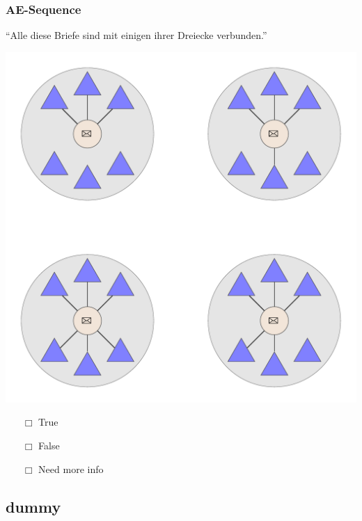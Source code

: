 \documentclass[fleqn,10pt,xcolor=dvipsnames]{beamer}
\renewcommand{\AE}{AE\xspace}
\newcommand{\mymark}[1]{{\color{mycol}{#1}}}
\begin{document}
\begin{frame}
  \frametitle{\AE-Sequence}
  \begin{center}
    ``Alle diese Briefe sind mit einigen ihrer Dreiecke verbunden.''

    \vspace{0.1cm}

    \includegraphics[width=0.5 \textwidth]{../../pictures/ae_01_7.pdf}

    \vspace{0.1cm}

    \begin{multicols}{3}
      \begin{itemize} 
      \item[$\Box$] True\\
        \onslide<2>{$\leadsto$  \mymark{false}}
      \item[$\Box$] False\\
        \onslide<2>{$\leadsto$ \mymark{local}}
      \item[$\Box$] Need more info 
      \end{itemize}
    \end{multicols}

  \end{center}
\end{frame}

\subsection{dummy}
\end{document}
